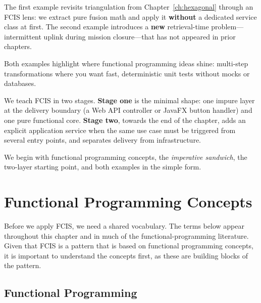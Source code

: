 The first example revisits triangulation from Chapter~\ref{ch:hexagonal} through an FCIS lens: we extract pure fusion math and apply it \textbf{without} a dedicated service class at first. The second example introduces a \textbf{new} retrieval-time problem---intermittent uplink during mission closure---that has not appeared in prior chapters.

Both examples highlight where functional programming ideas shine: multi-step transformations where you want fast, deterministic unit tests without mocks or databases.

\medskip

We teach FCIS in two stages. \textbf{Stage one} is the minimal shape: one impure layer at the delivery boundary (a Web API controller or JavaFX button handler) and one pure functional core. \textbf{Stage two}, towards the end of the chapter, adds an explicit application service when the same use case must be triggered from several entry points, and separates delivery from infrastructure.

We begin with functional programming concepts, the \textit{imperative sandwich}, the two-layer starting point, and both examples in the simple form.

\section{Functional Programming Concepts}
\label{sec:fcis_fp_concepts}

Before we apply FCIS, we need a shared vocabulary. The terms below appear throughout this chapter and in much of the functional-programming literature.\autocite{seemannFcis} Given that FCIS is a pattern that is based on functional programming concepts, it is important to understand the concepts first, as these are building blocks of the pattern.

\subsection{Functional Programming}
\label{sec:fcis_functional_programming}

